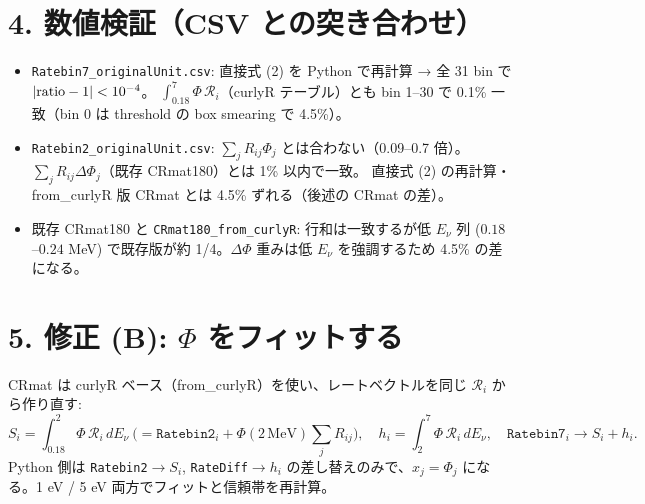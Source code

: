 \documentclass[11pt,a4paper]{ltjsarticle}
\newcommand{\Ev}{E_\nu}
\newcommand{\Phit}{\Phi(2\,\mathrm{MeV})}
\newcommand{\cR}{\mathcal{R}}
\begin{document}
\section*{4. 数値検証（CSV との突き合わせ）}
\begin{itemize}\itemsep2pt
\item \texttt{Ratebin7\_originalUnit.csv}: 直接式 (2) を Python で再計算 → 全 31 bin で $|{\rm ratio}-1|<10^{-4}$。
  $\int_{0.18}^{7}\Phi\,\cR_i$（curlyR テーブル）とも bin 1--30 で 0.1\% 一致（bin 0 は threshold の box smearing で 4.5\%）。
\item \texttt{Ratebin2\_originalUnit.csv}: $\sum_jR_{ij}\Phi_j$ とは合わない（0.09--0.7 倍）。
  $\sum_jR_{ij}\Delta\Phi_j$（既存 CRmat180）とは 1\% 以内で一致。
  直接式 (2) の再計算・from\_curlyR 版 CRmat とは 4.5\% ずれる（後述の CRmat の差）。
\item 既存 CRmat180 と \texttt{CRmat180\_from\_curlyR}: 行和は一致するが低 $\Ev$ 列 ($0.18$--$0.24$ MeV) で既存版が約 1/4。$\Delta\Phi$ 重みは低 $\Ev$ を強調するため 4.5\% の差になる。
\end{itemize}

\section*{5. 修正 (B): $\Phi$ をフィットする}
CRmat は curlyR ベース（from\_curlyR）を使い、レートベクトルを同じ $\cR_i$ から作り直す:
\begin{equation}
S_i=\int_{0.18}^{2}\!\Phi\,\cR_i\,d\Ev\ \Big(=\texttt{Ratebin2}_i+\Phit\textstyle\sum_jR_{ij}\Big),\quad
h_i=\int_{2}^{7}\!\Phi\,\cR_i\,d\Ev,\quad
\texttt{Ratebin7}_i\to S_i+h_i .
\end{equation}
Python 側は \texttt{Ratebin2}$\to S_i$, \texttt{RateDiff}$\to h_i$ の差し替えのみで、$x_j=\Phi_j$ になる。1 eV / 5 eV 両方でフィットと信頼帯を再計算。
\end{document}
